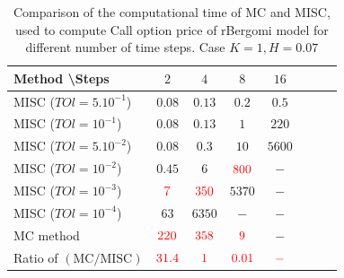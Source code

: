 \documentclass[11pt]{article}
\begin{document}
\begin{table}[h!]
	\centering
	\begin{tabular}{l*{6}{c}r}
		Method \textbackslash  Steps            & $2$ & $4$ & $8$ & $16$ &   \\
		\hline
			MISC ($TOl=5.10^{-1}$)  & $0.08$ & $0.13$ & $0.2$ & $0.5$  \\
		MISC ($TOl=10^{-1}$)  & $0.08$ & $0.13$ & $1$ & $220$  \\
		MISC ($TOl=5.10^{-2}$)  & $0.08$ & $0.3$ & $10$ & $5600$  \\
		MISC ($TOl=10^{-2}$)  & $0.45$ & $6$ & ${\color{red}800}$ & $-$  \\
		MISC ($TOl=10^{-3}$)  & ${\color{red}7}$ & ${\color{red}350}$ & $5370$ & $-$  \\		
			MISC ($TOl=10^{-4}$)  & $63$ & $6350$ & $-$ & $-$  \\	
\hline
		MC method & ${\color{red}220}$  & ${\color{red}358}$  & ${\color{red}9}$ & $-$  \\
		\hline	
		Ratio of $\left(\text{MC}/ \text{MISC} \right)$  &${\color{red}31.4}$ & ${\color{red}  1
		}$  & ${\color{red} 0.01	}$  & ${\color{red}-}$ \\
		\hline
	\end{tabular}
	\caption{Comparison of the computational time of  MC and MISC, used to compute Call option price of rBergomi model for different number of time steps. Case $K=1, H=0.07$}
	\label{Comparsion of the computational time of  MC and MISC, used to compute Call option price of rBergomi model for different number of time steps. Case $K=1, H=0.07$}
\end{table}




%	
\end{document}
